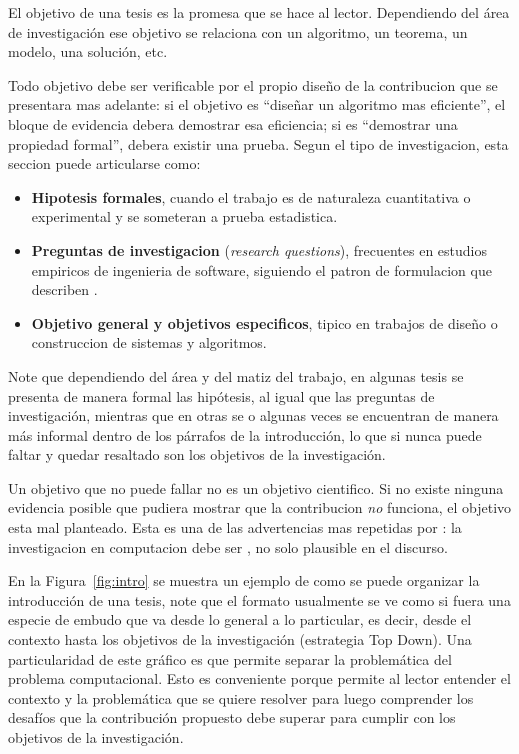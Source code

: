 \documentclass[11pt]{article}
\begin{document}
El objetivo de una tesis es la promesa que se hace al lector. Dependiendo
del área de investigación ese objetivo se relaciona con un algoritmo, 
un teorema, un modelo, una solución, etc. 

Todo objetivo debe ser verificable por el propio diseño de la contribucion
que se presentara mas adelante: si el objetivo es ``diseñar un algoritmo mas
eficiente'', el bloque de evidencia debera demostrar esa eficiencia; si es
``demostrar una propiedad formal'', debera existir una prueba. Segun el tipo
de investigacion, esta seccion puede articularse como:

\begin{itemize}
  
  \item \textbf{Hipotesis formales}, cuando el trabajo es de naturaleza
  cuantitativa o experimental y se someteran a prueba estadistica.
  \item \textbf{Preguntas de investigacion} (\emph{research questions}),
  frecuentes en estudios empiricos de ingenieria de software, siguiendo el
  patron de formulacion que describen \citet{wohlin2012experimentation}.
  \item \textbf{Objetivo general y objetivos especificos}, tipico en trabajos
  de diseño o construccion de sistemas y algoritmos.
  
\end{itemize}

Note que dependiendo del área y del matiz del trabajo, en algunas tesis se 
presenta de manera formal las hipótesis, al igual que las preguntas de investigación, mientras que en otras se
o algunas veces se encuentran de manera más informal dentro de los párrafos de la introducción,
lo que si nunca puede faltar y quedar resaltado son los objetivos de la investigación.



\begin{cajaAlerta}
Un objetivo que no puede fallar no es un objetivo cientifico. Si no existe
ninguna evidencia posible que pudiera mostrar que la contribucion \emph{no}
funciona, el objetivo esta mal planteado. Esta es una de las advertencias
mas repetidas por \citet{zobel2014writing}: la investigacion en computacion
debe ser , no solo plausible en el
discurso.
\end{cajaAlerta}

En la Figura~\ref{fig:intro} se muestra un ejemplo de como se puede organizar 
la introducción de una tesis, note que el formato usualmente se ve como si fuera
una especie de embudo que va desde lo general a lo particular, es decir, 
desde el contexto hasta los objetivos de la investigación (estrategia Top Down).
Una particularidad de este gráfico es que permite separar la problemática del 
problema computacional. Esto es conveniente porque permite al lector entender 
el contexto y la problemática que se quiere resolver para luego comprender los desafíos
que la contribución propuesto debe superar para cumplir con los objetivos 
de la investigación. 
\end{document}
